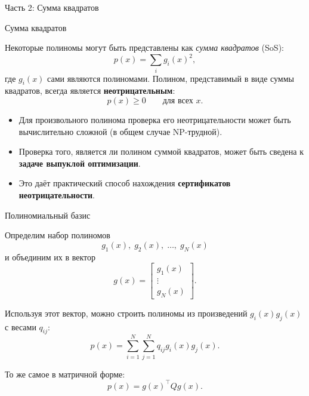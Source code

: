 \documentclass{beamer}
\begin{document}
\begin{frame}
	\begin{center}
		{\Large Часть 2: Сумма квадратов}
	\end{center}
\end{frame}


\begin{frame}{Сумма квадратов}
	\begin{flushleft}
		Некоторые полиномы могут быть представлены как \emph{сумма квадратов} (SoS):
		\[
		p(x) = \sum_i g_i(x)^2,
		\]
		где $g_i(x)$ сами являются полиномами. Полином, представимый в виде суммы квадратов, всегда является
		\textbf{неотрицательным}:
		\[
		p(x) \geq 0 \qquad \text{для всех }x.
		\]
		
		
		\begin{itemize}
			\item Для произвольного полинома проверка его неотрицательности
			может быть вычислительно сложной (в общем случае NP-трудной).
			
			\item Проверка того, является ли полином суммой квадратов, может быть сведена к
			\textbf{задаче выпуклой оптимизации}.
			
			\item Это даёт практический способ нахождения
			\textbf{сертификатов неотрицательности}.
		\end{itemize}
		
	\end{flushleft}
\end{frame}


\begin{frame}{Полиномиальный базис}
	\begin{flushleft}
		
		Определим набор полиномов
		\[
		g_1(x),\;g_2(x),\;\ldots,\;g_N(x)
		\]
		и объединим их в вектор
		\[
		g(x)=
		\begin{bmatrix}
			g_1(x)\\
			\vdots\\
			g_N(x)
		\end{bmatrix}.
		\]
		
		\bigskip
		
		Используя этот вектор, можно строить полиномы из произведений
		$g_i(x)g_j(x)$ с весами $q_{ij}$:
		\[
		p(x)=\sum_{i=1}^N\sum_{j=1}^N
		q_{ij}g_i(x)g_j(x).
		\]
		
		\bigskip
		
		То же самое в матричной форме:
		\[
		p(x)=g(x)^\top Qg(x).
		\]
		
		
	\end{flushleft}
\end{frame}
\end{document}

